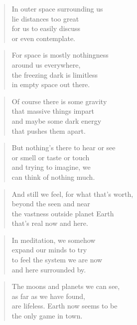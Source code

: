 \documentclass[14pt,a4paper]{article}
\begin{document}
\begin{verse}
In outer space surrounding us\\
lie distances too great\\
for us to easily discuss\\
or even contemplate.
\end{verse}

\begin{verse}
For space is mostly nothingness\\
around us everywhere,\\
the freezing dark is limitless\\
in empty space out there.
\end{verse}

\begin{verse}
Of course there is some gravity\\
that massive things impart\\
and maybe some dark energy\\
that pushes them apart.
\end{verse}

\begin{verse}
But nothing’s there to hear or see\\
or smell or taste or touch\\
and trying to imagine, we\\
can think of nothing much.
\end{verse}

\begin{verse}
And still we feel, for what that’s worth,\\
beyond the seen and near\\
the vastness outside planet Earth\\
that’s real now and here.
\end{verse}

\begin{verse}
In meditation, we somehow\\
expand our minds to try\\
to feel the system we are now\\
and here surrounded by.
\end{verse}

\begin{verse}
The moons and planets we can see,\\
as far as we have found,\\
are lifeless. Earth now seems to be\\
the only game in town.
\end{verse}
\end{document}
